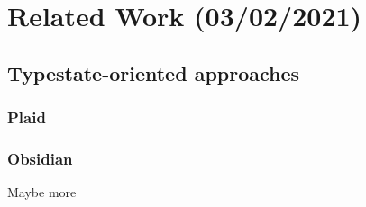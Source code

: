 \chapter{Related Work (03/02/2021)}\label{cha:related-work}

\section{Typestate-oriented approaches}
\subsection{Plaid}
\subsection{Obsidian}
Maybe more